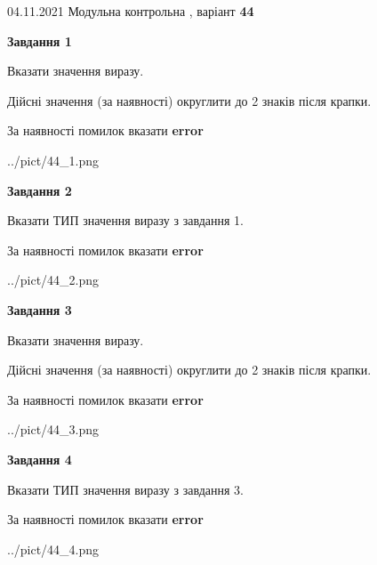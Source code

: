 \documentclass[11pt, ukrainian]{article}
\begin{document}
{04.11.2021 Модульна контрольна , варіант  \No \textbf { 44 }\par}
{
\begin {large}
{\begin {center}\textbf{Завдання 1}\end {center}}\par
Вказати значення виразу. \par
Дійсні значення (за наявності) округлити до 2 знаків після крапки. \par
За наявності помилок вказати \textbf{error}

\begin{center}
	{../pict/44_1.png}
\end{center}
\newpage

{\begin {center}\textbf{Завдання 2}\end {center}}\par
Вказати ТИП значення виразу з завдання 1. \par
За наявності помилок вказати \textbf{error}

\begin{center}
	{../pict/44_2.png}
\end{center}
\newpage

{\begin {center}\textbf{Завдання 3}\end {center}}\par
Вказати значення виразу. \par
Дійсні значення (за наявності) округлити до 2 знаків після крапки. \par
За наявності помилок вказати \textbf{error}

\begin{center}
	{../pict/44_3.png}
\end{center}
\newpage

{\begin {center}\textbf{Завдання 4}\end {center}}\par
Вказати ТИП значення виразу з завдання 3. \par
За наявності помилок вказати \textbf{error}

\begin{center}
	{../pict/44_4.png}
\end{center}
\newpage


\end{large}}
\end{document}
